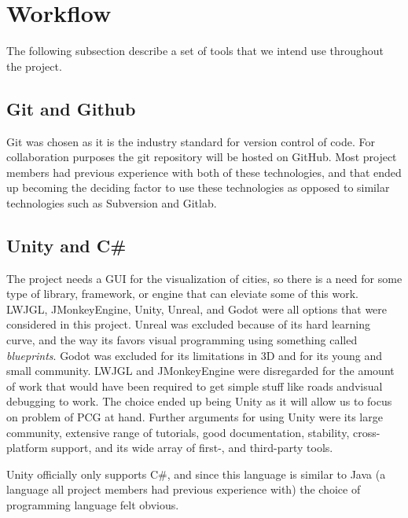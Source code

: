 \section{Workflow}


The following subsection describe a set of tools that we intend use throughout the project.

\subsection{Git and Github}
Git was chosen as it is the industry standard for version control of code.
For collaboration purposes the git repository will be hosted on GitHub.
Most project members had previous experience with both of these technologies,
and that ended up becoming the deciding factor to use these technologies as opposed to similar technologies such as Subversion and Gitlab.

\subsection{Unity and C\#}
The project needs a GUI for the visualization of cities, so there is a need for some type of library, framework, or engine that can eleviate some of this work.
LWJGL, JMonkeyEngine, Unity, Unreal, and Godot were all options that were considered in this project.
Unreal was excluded because of its hard learning curve, and the way its favors visual
programming using something called \textit{blueprints}.
Godot was excluded for its limitations in 3D and for its young and small community.
LWJGL and JMonkeyEngine were disregarded for the amount of work that would have been required to get simple stuff like roads andvisual debugging to work.
The choice ended up being Unity as it will allow us to focus on problem of PCG at hand.
Further arguments for using Unity were its large community, extensive range of tutorials, good documentation, stability, cross-platform support, and its wide array of first-, and third-party tools.

Unity officially only supports C\#, and since this language is similar to Java (a language all project members had previous experience with) the choice of programming language felt obvious.